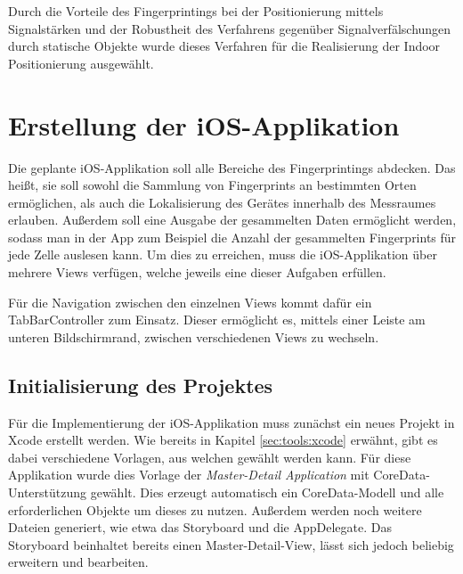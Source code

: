 Durch die Vorteile des Fingerprintings bei der Positionierung mittels Signalstärken und der Robustheit des Verfahrens gegenüber Signalverfälschungen durch statische Objekte wurde dieses Verfahren für die Realisierung der Indoor Positionierung ausgewählt.


\section{Erstellung der iOS-Applikation}
\label{sec:implementation:iosapplication}

Die geplante iOS-Applikation soll alle Bereiche des Fingerprintings abdecken. 
Das heißt, sie soll sowohl die Sammlung von Fingerprints an bestimmten Orten ermöglichen, als auch die Lokalisierung des Gerätes innerhalb des Messraumes erlauben.
Außerdem soll eine Ausgabe der gesammelten Daten ermöglicht werden, sodass man in der App zum Beispiel die Anzahl der gesammelten Fingerprints für jede Zelle auslesen kann.
Um dies zu erreichen, muss die iOS-Applikation über mehrere Views verfügen, welche jeweils eine dieser Aufgaben erfüllen.

Für die Navigation zwischen den einzelnen Views kommt dafür ein TabBarController zum Einsatz. Dieser ermöglicht es, mittels einer Leiste am unteren Bildschirmrand, zwischen verschiedenen Views zu wechseln.


\subsection{Initialisierung des Projektes}
\label{sec:implementation:iosapplication:initializing}

Für die Implementierung der iOS-Applikation muss zunächst ein neues Projekt in Xcode erstellt werden. Wie bereits in Kapitel \ref{sec:tools:xcode} erwähnt, gibt es dabei verschiedene Vorlagen, aus welchen gewählt werden kann. Für diese Applikation wurde dies Vorlage der \emph{Master-Detail Application} mit CoreData-Unterstützung gewählt. Dies erzeugt automatisch ein CoreData-Modell und alle erforderlichen Objekte um dieses zu nutzen. Außerdem werden noch weitere Dateien generiert, wie etwa das Storyboard und die AppDelegate.
Das Storyboard beinhaltet bereits einen Master-Detail-View, lässt sich jedoch beliebig erweitern und bearbeiten. 

